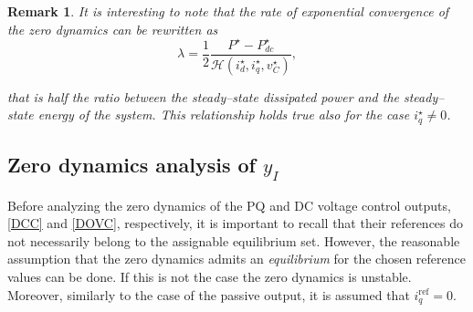 \documentclass[5p,twocolumn]{elsarticle}
\newtheorem{remark}[theorem]{Remark}
\numberwithin{equation}{section}
\begin{document}
\begin{remark}\em
It is interesting to note that the rate of exponential convergence of the zero dynamics can be rewritten as
$$
\lambda=\frac{1}{2}\frac{P^\star-P_{dc}^\star}{\mathcal{H}(i^\star _{d},i^\star _{q},v^\star _{C})},
$$

that is half the ratio between the steady--state dissipated power and the steady--state energy of the system. This relationship holds true also for the case $i_q^\star \neq 0$.
\end{remark}
\subsection{Zero dynamics analysis of $y_I$}
\label{zerdyn1}
Before analyzing the zero dynamics of the PQ and DC voltage control outputs,  \eqref{DCC} and  \eqref{DOVC}, respectively, it is important to recall that their references  do not necessarily  belong to the assignable
equilibrium set. However, the reasonable assumption that the zero dynamics admits an {\em equilibrium} for the chosen reference values can be done. If this is not the case the zero dynamics is unstable.
Moreover, similarly to the case of the passive output, it is assumed that $i_q^{\mathrm{ref}}=0$.
\end{document}
